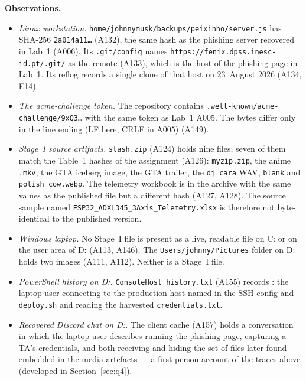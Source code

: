 \documentclass[11pt,a4paper,final,oneside]{article}
\begin{document}
\textbf{Observations.}
\begin{itemize}
  \item \textit{Linux workstation.} \texttt{home/johnnymusk/backups/peixinho/server.js} has SHA-256 \texttt{2a014a11\ldots} (A132), the same hash as the phishing server recovered in Lab~1 (A006). Its \texttt{.git/config} names \texttt{https://fenix.dpss.inesc-id.pt/.git/} as the remote (A133), which is the host of the phishing page in Lab~1. Its reflog records a single clone of that host on 23~August 2026 (A134, E14).
  \item \textit{The acme-challenge token.} The repository contains \texttt{.well-known/acme-challenge/9xQ3\ldots} with the same token as Lab~1 A005. The bytes differ only in the line ending (LF here, CRLF in A005) (A149).
  \item \textit{Stage~I source artifacts.} \texttt{stash.zip} (A124) holds nine files; seven of them match the Table~1 hashes of the assignment (A126): \texttt{myzip.zip}, the anime \texttt{.mkv}, the GTA iceberg image, the GTA trailer, the \texttt{dj\_cara} WAV, \texttt{blank} and \texttt{polish\_cow.webp}. The telemetry workbook is in the archive with the same values as the published file but a different hash (A127, A128). The source sample named \texttt{ESP32\_ADXL345\_3Axis\_Telemetry.xlsx} is therefore not byte-identical to the published version.
  \item \textit{Windows laptop.} No Stage~I file is present as a live, readable file on C: or on the user area of D: (A113, A146). The \texttt{Users/johnny/Pictures} folder on D: holds two images (A111, A112). Neither is a Stage~I file.
  \item \textit{PowerShell history on D:.} \texttt{ConsoleHost\_history.txt} (A155) records \texttt{}: the laptop user connecting to the production host named in the SSH config and \texttt{deploy.sh} and reading the harvested \texttt{credentials.txt}.
  \item \textit{Recovered Discord chat on D:.} The client cache (A157) holds a conversation in which the laptop user describes running the phishing page, capturing a TA's credentials, and both receiving and hiding the set of files later found embedded in the media artefacts --- a first-person account of the traces above (developed in Section~\ref{sec:q4}).
\end{itemize}
\end{document}

